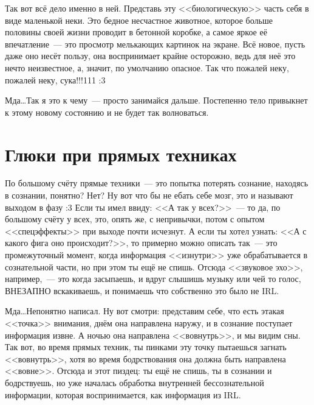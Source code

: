 \documentclass[a5paper,12pt,twoside]{memoir}
\begin{document}
Так вот всё дело именно в ней. Представь эту <<биологическую>> часть себя в виде маленькой неки. Это бедное несчастное животное, которое больше половины своей жизни проводит в бетонной коробке, а самое яркое её впечатление~--- это просмотр мелькающих картинок на экране. Всё новое, пусть даже оно несёт пользу, она воспринимает крайне осторожно, ведь для неё это нечто неизвестное, а, значит, по умолчанию опасное. Так что пожалей неку, пожалей неку, сука!!!111 :3
 
Мда\ldots Так я это к чему~--- просто занимайся дальше. Постепенно тело привыкнет к этому новому состоянию и не будет так волноваться. 




\section{Глюки при прямых техниках}


\medskip

По большому счёту прямые техники~--- это попытка потерять сознание, находясь в сознании, понятно? Нет? Ну вот что бы не ебать себе мозг, это и называют выходом в фазу :3 Если ты имел ввиду: <<А так у всех?>>~--- то да, по большому счёту у всех, это, опять же, с непривычки, потом с опытом <<спецэффекты>> при выходе почти исчезнут. А если ты хотел узнать: <<А с какого фига оно происходит?>>, то примерно можно описать так~--- это промежуточный момент, когда информация <<изнутри>> уже обрабатывается в сознательной части, но при этом ты ещё не спишь. Отсюда <<звуковое эхо>>, например,~--- это когда засыпаешь, и вдруг слышишь музыку или чей то голос, ВНЕЗАПНО вскакиваешь, и понимаешь что собственно это было не IRL.
 
Мда\ldots Непонятно написал. Ну вот смотри: представим себе, что есть этакая <<точка>> внимания, днём она направлена наружу, и в сознание поступает информация извне. А ночью она направлена <<вовнутрь>>, и мы видим сны. Так вот, во время прямых техник, ты пинками эту точку пытаешься загнать <<вовнутрь>>, хотя во время бодрствования она должна быть направлена <<вовне>>. Отсюда и этот пиздец: ты ещё не спишь, ты в сознании и бодрствуешь, но уже началась обработка внутренней бессознательной информации, которая воспринимается, как информация из IRL. 
\end{document}
